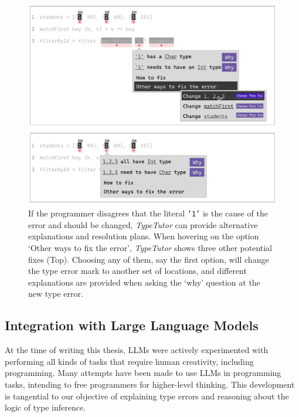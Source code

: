 \begin{figure}[hbt]
  \includegraphics[width=\linewidth]{WhatIf}
  \caption{
      If the programmer disagrees that the literal \texttt{'1'} is the cause of the error and should be changed, \textit{TypeTutor} can provide alternative explanations and resolution plans. When hovering on the option `Other ways to fix the error', \textit{TypeTutor} shows three other potential fixes (Top). Choosing any of them, say the first option, will change the type error mark to another set of locations, and different explanations are provided when asking the `why' question at the new type error.
    }
\end{figure}


\subsection{Integration with Large Language Models}
At the time of writing this thesis, LLMs were actively experimented with performing all kinds of tasks that require human creativity, including programming. Many attempts have been made to use LLMs in programming tasks, intending to free programmers for higher-level thinking. This development is tangential to our objective of explaining type errors and reasoning about the logic of type inference. 

